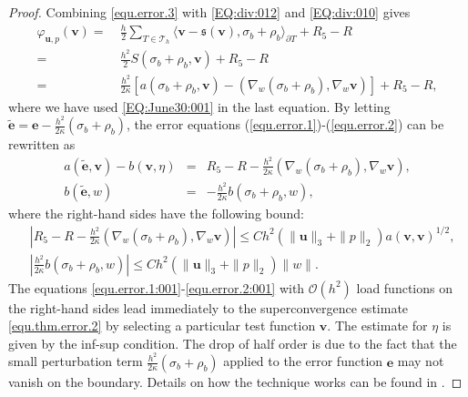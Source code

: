 \documentclass[final,leqno]{siamltex704}
\def\S{{\mathfrak s}}
\def\T{{\mathcal T}}
\def\O{{\mathcal O}}
\def\pT{{\partial T}}
\begin{document}
\begin{proof}
Combining \eqref{equ.error.3} with \eqref{EQ:div:012} and \eqref{EQ:div:010} gives
\begin{equation}\label{EQ:div:015}
\begin{split}
\varphi_{\bm{u},p}(\bm{v}) = &\ \frac{h}{2} \sum_{T\in\T_h} \langle \bm{v} - \S(\bm{v}), \sigma_b+\rho_b\rangle_\pT + R_5 -R\\
= & \ \frac{h^2}{2} S(\sigma_b+\rho_b, \bm{v}) + R_5 -R\\
= & \ \frac{h^2}{2\kappa} \left[ a(\sigma_b+\rho_b, \bm{v}) - (\nabla_w( \sigma_b+\rho_b), \nabla_w \bm{v})\right] + R_5 - R,
\end{split}
\end{equation}
where we have used \eqref{EQ:June30:001} in the last equation. By letting $\tilde {\bm{e}} = \bm{e} - \frac{h^2}{2\kappa} (\sigma_b+\rho_b)$, the error equations (\ref{equ.error.1})-(\ref{equ.error.2}) can be rewritten as
\begin{eqnarray}
a(\tilde{\bm{e}},\bm{v})-b(\bm{v},\eta) &=& R_5-R - \frac{h^2}{2\kappa} (\nabla_w( \sigma_b+\rho_b), \nabla_w \bm{v}), \label{equ.error.1:001}\\
b(\tilde{\bm{e}},w)&=&- \frac{h^2}{2\kappa} b(\sigma_b+\rho_b,w),\label{equ.error.2:001}
\end{eqnarray}
where the right-hand sides have the following bound:
\begin{equation}\label{EQ:div:018}
\begin{split}
&\left| R_5-R - \frac{h^2}{2\kappa} (\nabla_w( \sigma_b+\rho_b), \nabla_w \bm{v})\right| \leq C h^2 (\|\bm{u}\|_3 + \|p\|_2) a(\bm{v},\bm{v})^{1/2},\\
&\left| \frac{h^2}{2\kappa} b(\sigma_b+\rho_b,w)\right| \leq C h^2 (\|\bm{u}\|_3 + \|p\|_2) \|w\|.
\end{split}
\end{equation}
The equations \eqref{equ.error.1:001}-\eqref{equ.error.2:001} with $\O(h^2)$ load functions on the right-hand sides lead immediately to the superconvergence estimate \eqref{equ.thm.error.2} by selecting a particular test function $\bm{v}$. The estimate for $\eta$ is given by the inf-sup condition. The drop of half order is due to the fact that the small perturbation term $\frac{h^2}{2\kappa} (\sigma_b+\rho_b)$ applied to the error function $\bm{e}$ may not vanish on the boundary. Details on how the technique works can be found in \cite{LiDanWW}.
\end{proof}
\end{document}
